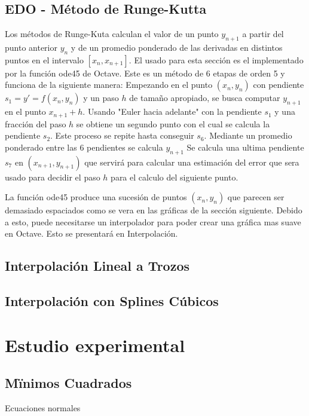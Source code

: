 \documentclass{endm}
\begin{document}
\subsection{EDO - Método de Runge-Kutta}
Los métodos de Runge-Kuta calculan el valor de un punto $y_{n+1}$ a partir del punto anterior $y_n$ y de
un promedio ponderado de las derivadas en distintos puntos en el intervalo $[x_n, x_{n+1}]$.
El usado para esta sección es el implementado por la función ode45 de Octave.
Este es un método de 6 etapas de orden 5 y funciona de la siguiente manera:
Empezando en el punto $(x_n,y_n)$ con pendiente $s_1 = y' = f(x_n,y_n)$ y un paso $h$ de tamaño apropiado,
se busca computar $y_{n+1}$ en el punto $x_{n+1} + h$.
Usando "Euler hacia adelante" con la pendiente $s_1$ y una fracción del paso $h$ se obtiene un segundo punto
con el cual se calcula la pendiente $s_2$. Este proceso se repite hasta conseguir $s_6$.
Mediante un promedio ponderado entre las 6 pendientes se calcula $y_{n+1}$
Se calcula una ultima pendiente $s_7$ en $(x_{n+1},y_{n+1})$ que servirá para calcular una estimación
del error que sera usado para decidir el paso $h$ para el calculo del siguiente punto.

La función ode45 produce una sucesión de puntos $(x_n,y_n)$ que parecen ser demasiado espaciados como se vera
en las gráficas de la sección siguiente. Debido a esto, puede necesitarse un interpolador para poder crear una
gráfica mas suave en Octave. Esto se presentará en Interpolación.


\subsection{Interpolación Lineal a Trozos}


\subsection{Interpolación con Splines Cúbicos}

\section{Estudio experimental}
\subsection{Mïnimos Cuadrados}
Ecuaciones normales
\clearpage
\end{document}
